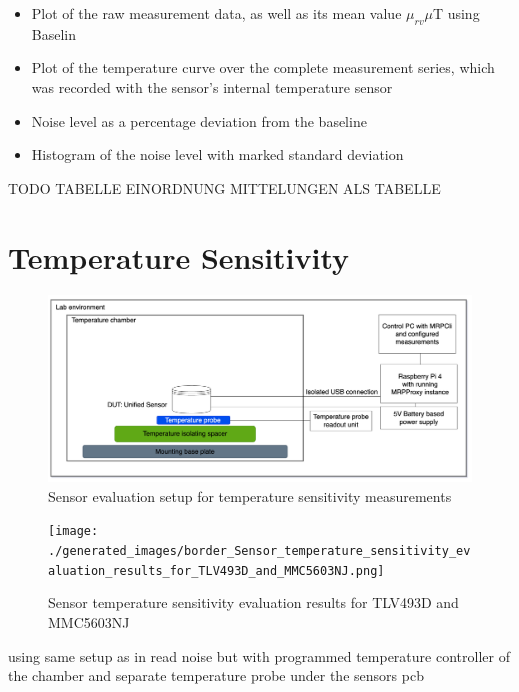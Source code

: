\begin{itemize}
\tightlist
\item
  Plot of the raw measurement data, as well as its mean value
  \(\mu_{rv}\)\(\mu\)T using Baselin
\item
  Plot of the temperature curve over the complete measurement series,
  which was recorded with the sensor's internal temperature sensor
\item
  Noise level as a percentage deviation from the baseline
\item
  Histogram of the noise level with marked standard deviation
\end{itemize}

TODO TABELLE EINORDNUNG MITTELUNGEN ALS TABELLE

\hypertarget{temperature-sensitivity}{%
\section{Temperature Sensitivity}\label{temperature-sensitivity}}

\begin{figure}
\centering
\includegraphics{./generated_images/border_Sensor_evaluation_setup_for_temperature_sensitivity_measurements.png}
\caption{Sensor evaluation setup for temperature sensitivity
measurements
\label{Sensor_evaluation_setup_for_temperature_sensitivity_measurements.png}}
\end{figure}

\begin{figure}
\centering
\texttt{[image: ./generated\_images/border\_Sensor\_temperature\_sensitivity\_evaluation\_results\_for\_TLV493D\_and\_MMC5603NJ.png]}
\caption{Sensor temperature sensitivity evaluation results for TLV493D
and MMC5603NJ
\label{Sensor_temperature_sensitivity_evaluation_results_for_TLV493D_and_MMC5603NJ.png}}
\end{figure}

using same setup as in read noise but with programmed temperature
controller of the chamber and separate temperature probe under the
sensors pcb

